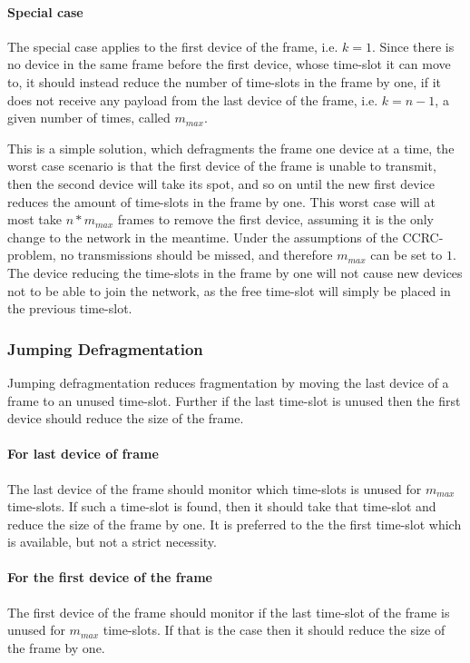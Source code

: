 \paragraph{Special case}
The special case applies to the first device of the frame, i.e. $k = 1$. 
Since there is no device in the same frame before the first device, whose time-slot it can move to, it should instead reduce the number of time-slots in the frame by one, if it does not receive any payload from the last device of the frame, i.e. $k = n - 1$, a given number of times, called $m_{max}$. 


\bigskip

This is a simple solution, which defragments the frame one device at a time, the worst case scenario is that the first device of the frame is unable to transmit, then the second device will take its spot, and so on until the new first device reduces the amount of time-slots in the frame by one. 
This worst case will at most take $n * m_{max}$ frames to remove the first device, assuming it is the only change to the network in the meantime. 
Under the assumptions of the CCRC-problem, no transmissions should be missed, and therefore $m_{max}$ can be set to $1$. 
The device reducing the time-slots in the frame by one will not cause new devices not to be able to join the network, as the free time-slot will simply be placed in the previous time-slot. 

\subsubsection{Jumping Defragmentation}
Jumping defragmentation reduces fragmentation by moving the last device of a frame to an unused time-slot. Further if the last time-slot is unused then the first device should reduce the size of the frame.

\paragraph{For last device of frame}
The last device of the frame should monitor which time-slots is unused for $m_{max}$ time-slots. 
If such a time-slot is found, then it should take that time-slot and reduce the size of the frame by one. 
It is preferred to the the first time-slot which is available, but not a strict necessity.   

\paragraph{For the first device of the frame}
The first device of the frame should monitor if the last time-slot of the frame is unused for $m_{max}$ time-slots.
If that is the case then it should reduce the size of the frame by one.

